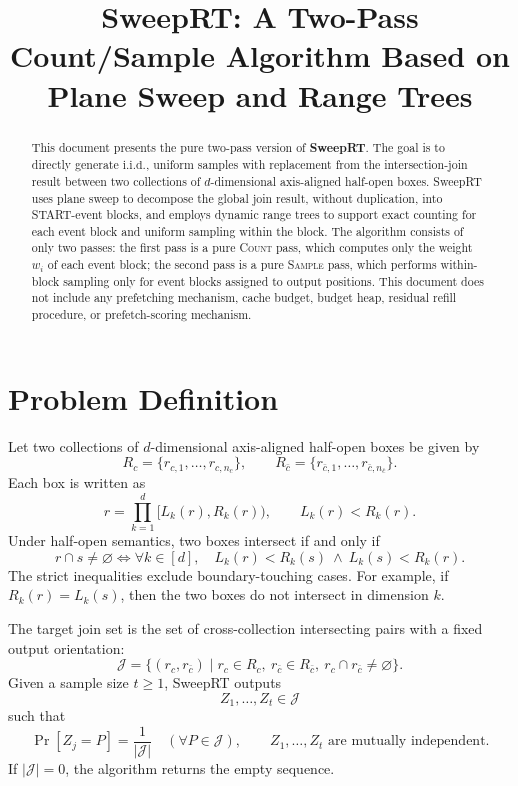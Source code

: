\documentclass[11pt]{article}
\title{\textbf{SweepRT: A Two-Pass Count/Sample Algorithm Based on Plane Sweep and Range Trees}}
\author{}
\date{}
\newcommand{\Rc}{R_c}
\newcommand{\Rbar}{R_{\bar c}}
\newcommand{\J}{\mathcal J}
\newcommand{\iid}{\mathrm{i.i.d.}}
\begin{document}
\maketitle

\begin{abstract}
This document presents the pure two-pass version of \textbf{SweepRT}. The goal is to directly generate \(\iid\), uniform samples with replacement from the intersection-join result between two collections of \(d\)-dimensional axis-aligned half-open boxes. SweepRT uses plane sweep to decompose the global join result, without duplication, into START-event blocks, and employs dynamic range trees to support exact counting for each event block and uniform sampling within the block. The algorithm consists of only two passes: the first pass is a pure \textsc{Count} pass, which computes only the weight \(w_i\) of each event block; the second pass is a pure \textsc{Sample} pass, which performs within-block sampling only for event blocks assigned to output positions. This document does not include any prefetching mechanism, cache budget, budget heap, residual refill procedure, or prefetch-scoring mechanism.
\end{abstract}

\section{Problem Definition}

Let two collections of \(d\)-dimensional axis-aligned half-open boxes be given by
\[
\Rc=\{r_{c,1},\ldots,r_{c,n_c}\},\qquad
\Rbar=\{r_{\bar c,1},\ldots,r_{\bar c,n_{\bar c}}\}.
\]
Each box is written as
\[
 r=\prod_{k=1}^{d}[L_k(r),R_k(r)),\qquad L_k(r)<R_k(r).
\]
Under half-open semantics, two boxes intersect if and only if
\[
 r\cap s\neq\varnothing
 \iff
 \forall k\in[d],\quad L_k(r)<R_k(s)\ \wedge\ L_k(s)<R_k(r).
\]
The strict inequalities exclude boundary-touching cases. For example, if \(R_k(r)=L_k(s)\), then the two boxes do not intersect in dimension \(k\).

The target join set is the set of cross-collection intersecting pairs with a fixed output orientation:
\[
\J=\{(r_c,r_{\bar c})\mid r_c\in\Rc,\ r_{\bar c}\in\Rbar,
      \ r_c\cap r_{\bar c}\neq\varnothing\}.
\]
Given a sample size \(t\ge 1\), SweepRT outputs
\[
 Z_1,\ldots,Z_t\in\J
\]
such that
\[
 \Pr[Z_j=P]=\frac1{|\J|}\quad(\forall P\in\J),
 \qquad Z_1,\ldots,Z_t\text{ are mutually independent}.
\]
If \(|\J|=0\), the algorithm returns the empty sequence.
\end{document}
